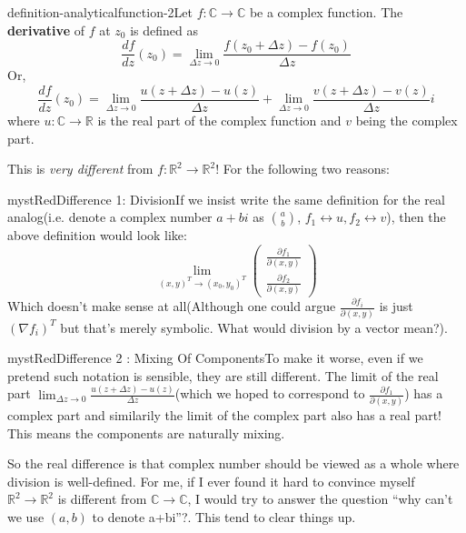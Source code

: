 \begin{mystthmdefinition}{}{definition-analyticalfunction-2}Let $f:\mathbb{C} \to \mathbb{C}$ be a complex function. The \textbf{derivative} of $f$ at $z_0$ is defined as
\begin{equation}
\frac{df}{dz}({z_0})= \lim_{\Delta z\to 0}\frac{f(z_0 + \Delta z) -f(z_0)}{\Delta z}
\end{equation}
Or,
\begin{equation}
\frac{df}{dz}({z_0})= \lim_{\Delta z\to 0}\frac{u(z+\Delta z) -u(z)}{\Delta z} + \lim_{\Delta z\to 0}\frac{v(z+\Delta z) -v(z)}{\Delta z} i
\end{equation}
where $u : \mathbb{C} \to \mathbb{R}$ is the real part of the complex function and $v$ being the complex part.

\end{mystthmdefinition}
This is \textit{very different} from $f:\mathbb{R}^2 \to \mathbb{R}^2$! For the following two reasons:

\begin{mystadmonition}{mystRed}{Difference 1: Division}\label{division}If we insist write the same definition for the real analog(i.e. denote a complex number $a+bi$ as $a \choose b$, $f_1\leftrightarrow u, f_2\leftrightarrow v$), then the above definition would look like:
\begin{equation}
\lim_{(x,y)^T \to (x_0,y_0)^T}
\begin{pmatrix}
\frac{\partial f_1}{\partial (x, y)} \\
\frac{\partial f_2}{\partial (x, y)}
\end{pmatrix}
\end{equation}
Which doesn't make sense at all(Although one could argue $\frac{\partial f_i}{\partial (x,y)}$ is just $(\nabla f_i)^T$ but that's merely symbolic. What would division by a vector mean?).

\end{mystadmonition}
\begin{mystadmonition}{mystRed}{Difference 2 : Mixing Of Components}\label{mixing-of-components}To make it worse, even if we pretend such notation is sensible, they are still different. The limit of the real part $\lim_{\Delta z\to 0}\frac{u(z+\Delta z) -u(z)}{\Delta z}$(which we hoped to correspond to $\frac{\partial f_1}{\partial (x,y)}$) has a complex part and similarily the limit of the complex part also has a real part! This means the components are naturally mixing.

\end{mystadmonition}
So the real difference is that complex number should be viewed as a whole where division is well-defined. For me, if I ever found it hard to convince myself $\mathbb{R}^2 \to \mathbb{R}^2$ is different from $\mathbb{C} \to \mathbb{C}$, I would try to answer the question ``why can't we use $(a,b)$ to denote a+bi''?. This tend to clear things up.

